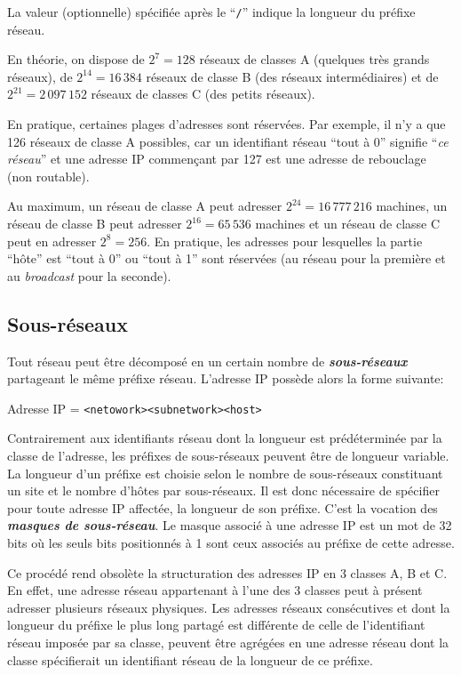 \documentclass[11pt,english,french]{scrreprt}
\theoremstyle{remark}
\theoremstyle{definition}
\begin{document}
La valeur (optionnelle) spécifiée après le “\lstinline!/!” indique la longueur du préfixe réseau.

En théorie, on dispose de $2^7 = 128$ réseaux de classes A (quelques très grands réseaux), de $2^{14} = 16\,384$ réseaux de classe B (des réseaux intermédiaires) et de $2^{21} = 2\,097\,152$ réseaux de classes C (des petits réseaux).

En pratique, certaines plages d'adresses sont réservées. Par exemple, il n'y a que 126 réseaux de classe A possibles, car un identifiant réseau “tout à 0” signifie “\emph{ce réseau}” et une adresse IP commençant par 127 est une adresse de rebouclage (non routable).

Au maximum, un réseau de classe A peut adresser $2^{24} = 16\,777\,216$ machines, un réseau de classe B peut adresser $2^{16} = 65\,536$ machines et un réseau de classe C peut en adresser $2^8 = 256$. En pratique, les adresses pour lesquelles la partie “hôte” est “tout à 0” ou “tout à 1” sont réservées (au réseau pour la première et au \emph{broadcast} pour la seconde).

\subsection{Sous-réseaux} %

Tout réseau peut être décomposé en un certain nombre de \emph{\textbf{sous-réseaux}} partageant le même préfixe réseau. L'adresse IP possède alors la forme suivante:

\qquad Adresse IP = \lstinline!<netowork><subnetwork><host>!

Contrairement aux identifiants réseau dont la longueur est prédéterminée par la classe de l'adresse, les préfixes de sous-réseaux peuvent être de longueur variable. La longueur d'un préfixe est choisie selon le nombre de sous-réseaux constituant un site et le nombre d'hôtes par sous-réseaux. Il est donc nécessaire de spécifier pour toute adresse IP affectée, la longueur de son préfixe. C'est la vocation des \emph{\textbf{masques de sous-réseau}}. Le masque associé à une adresse IP est un mot de 32 bits où les seuls bits positionnés à 1 sont ceux associés au préfixe de cette adresse.

Ce procédé rend obsolète la structuration des adresses IP en 3 classes A, B et C. En effet, une adresse réseau appartenant à l'une des 3 classes peut à présent adresser plusieurs réseaux physiques. Les adresses réseaux consécutives et dont la longueur du préfixe le plus long partagé est différente de celle de l'identifiant réseau imposée par sa classe, peuvent être agrégées en une adresse réseau dont la classe spécifierait un identifiant réseau de la longueur de ce préfixe.
\newline
\end{document}
